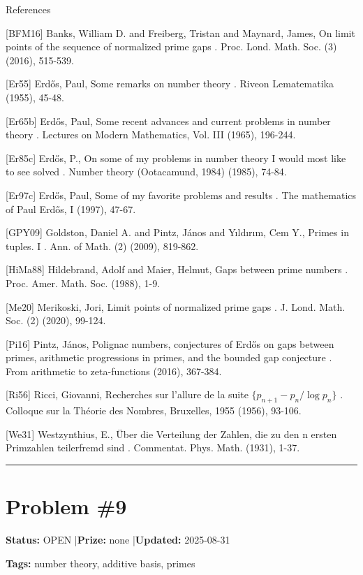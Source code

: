 \documentclass{article}
\begin{document}
References

[BFM16] Banks, William D. and Freiberg, Tristan and Maynard, James, On limit points of the sequence of normalized prime gaps . Proc. Lond. Math. Soc. (3) (2016), 515-539.

[Er55] Erd\H{o}s, Paul, Some remarks on number theory . Riveon Lematematika (1955), 45-48.

[Er65b] Erd\H{o}s, Paul, Some recent advances and current problems in number theory . Lectures on Modern Mathematics, Vol. III (1965), 196-244.

[Er85c] Erd\H{o}s, P., On some of my problems in number theory I would most like to see solved . Number theory (Ootacamund, 1984) (1985), 74-84.

[Er97c] Erd\H{o}s, Paul, Some of my favorite problems and results . The mathematics of Paul Erd\H{o}s, I (1997), 47-67.

[GPY09] Goldston, Daniel A. and Pintz, J\'{a}nos and Y\i ld\i r\i m, Cem Y., Primes in tuples. I . Ann. of Math. (2) (2009), 819-862.

[HiMa88] Hildebrand, Adolf and Maier, Helmut, Gaps between prime numbers . Proc. Amer. Math. Soc. (1988), 1-9.

[Me20] Merikoski, Jori, Limit points of normalized prime gaps . J. Lond. Math. Soc. (2) (2020), 99-124.

[Pi16] Pintz, J\'{a}nos, Polignac numbers, conjectures of Erd\H{o}s on gaps between primes, arithmetic progressions in primes, and the bounded gap conjecture . From arithmetic to zeta-functions (2016), 367-384.

[Ri56] Ricci, Giovanni, Recherches sur l'allure de la suite $\{p_{n+1}-p_n/\log p_n\}$ . Colloque sur la Th\'{e}orie des Nombres, Bruxelles, 1955 (1956), 93-106.

[We31] Westzynthius, E., \"{U}ber die Verteilung der Zahlen, die zu den n ersten Primzahlen teilerfremd sind . Commentat. Phys. Math. (1931), 1-37.

\noindent\rule{\linewidth}{0.4pt}


\section{Problem \#9}
\label{prob:9}

\noindent\textbf{Status:} OPEN \quad|\quad \textbf{Prize:} none \quad|\quad \textbf{Updated:} 2025-08-31

\noindent\textbf{Tags:} number theory, additive basis, primes
\end{document}
